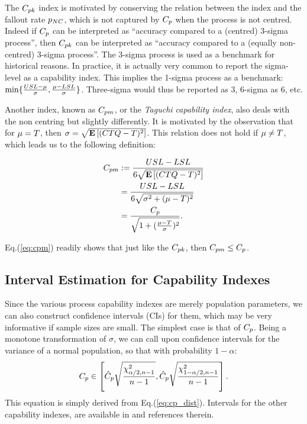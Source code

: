 The $C_{pk}$ index is motivated by conserving the relation between the index and the fallout rate $p_{NC}$, which is not captured by $C_p$ when the process is not centred. 
Indeed if $C_p$ can be interpreted as ``accuracy compared to a (centred) 3-sigma process'', then $C_{pk}$ can be interpreted as ``accuracy compared to a (equally non-centred) 3-sigma process''.
The 3-sigma process is used as a benchmark for historical reasons. 
In practice, it is actually very common to report the sigma-level as a capability index. This implies the 1-sigma process as a benchmark: $\min\{ \frac{USL-\mu}{\sigma},\frac{\mu-LSL}{\sigma} \}$. Three-sigma would thus be reported as $3$, 6-sigma as $6$, etc.


Another index, known as $\cpm$, or the \emph{Taguchi capability index}, also deals with the non centring but slightly differently. It is motivated by the observation that for $\mu=T$, then $\sigma=\sqrt{\mathbf{E}\left[ (CTQ-T)^2 \right]}$. This relation does not hold if $\mu \not=T$, which leads us to the following definition:
\begin{definition}[$\cpm$]
\begin{align}
		C_{pm} &:= \frac{USL-LSL}{6 \sqrt{\mathbf{E}\left[ (CTQ-T)^2 \right]}} \\
		&= 	\frac{USL-LSL}{6 \sqrt{\sigma^2+(\mu-T)^2}} \\ 
		&= \frac{C_p}{\sqrt{1+(\frac{\mu-T}{\sigma})^2}}. \label{eq:cpm}
\end{align}
\end{definition}
Eq.(\ref{eq:cpm}) readily shows that just like the $C_{pk}$, then $C_{pm} \leq C_p$. 








\subsection{Interval Estimation for Capability Indexes}
Since the various process capability indexes are merely population parameters, we can also construct confidence intervals (CIs) for them, which may be very informative if sample sizes are small.
The simplest case is that of $C_p$. Being a monotone transformation of $\sigma$, we can call upon confidence intervals for the variance of a normal population, so that with probability $1-\alpha$:
\begin{align}
\label{eq:ci_for_cp}
	C_p \in \left[ 
		\hat{C}_p \sqrt{\frac{\chi^2_{\alpha/2,n-1}}{n-1}},
		\hat{C}_p \sqrt{\frac{\chi^2_{1-\alpha/2,n-1}}{n-1}}
	\right].
\end{align}
This equation is simply derived from Eq.(\ref{eq:cp_dist}).
Intervals for the other capability indexes, are available in \cite{montgomery_introduction_2007} and references therein. 




